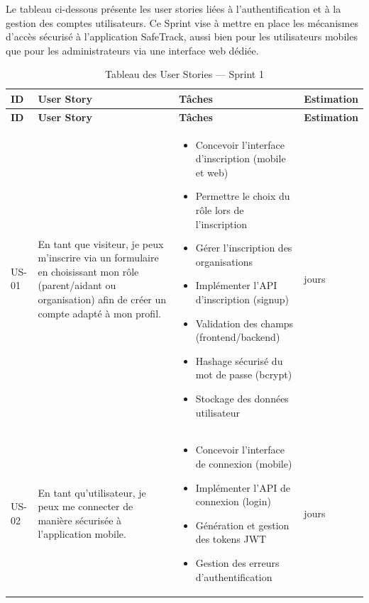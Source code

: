 Le tableau ci-dessous présente les user stories liées à l'authentification et à la gestion des comptes utilisateurs. Ce Sprint vise à mettre en place les mécanismes d'accès sécurisé à l'application SafeTrack, aussi bien pour les utilisateurs mobiles que pour les administrateurs via une interface web dédiée.

\small
\setlength{\tabcolsep}{3pt}
\renewcommand{\arraystretch}{1.0}
\setlength{\parskip}{0pt}
\begin{longtable}{|>{\centering\arraybackslash}p{}|>{\raggedright\arraybackslash}p{}|>{\raggedright\arraybackslash}p{}|>{\centering\arraybackslash}p{}|}
\caption{Tableau des User Stories — Sprint 1} \\
\hline
\textbf{ID} & \textbf{User Story} & \textbf{Tâches} & \textbf{Estimation} \\ \hline
\endfirsthead

\hline
\textbf{ID} & \textbf{User Story} & \textbf{Tâches} & \textbf{Estimation} \\ \hline
\endhead

\hline
\endlastfoot

US-01 & En tant que visiteur, je peux m'inscrire via un formulaire en choisissant mon rôle (parent/aidant ou organisation) afin de créer un compte adapté à mon profil.
& \begin{itemize}[leftmargin=*, nosep]
\item Concevoir l'interface d'inscription (mobile et web)
\item Permettre le choix du rôle lors de l'inscription
\item Gérer l'inscription des organisations
\item Implémenter l'API d'inscription (signup)
\item Validation des champs (frontend/backend)
\item Hashage sécurisé du mot de passe (bcrypt)
\item Stockage des données utilisateur
\end{itemize}
& 3 jours \\ \hline

US-02 & En tant qu'utilisateur, je peux me connecter de manière sécurisée à l'application mobile.
& \begin{itemize}[leftmargin=*, nosep]
\item Concevoir l'interface de connexion (mobile)
\item Implémenter l'API de connexion (login)
\item Génération et gestion des tokens JWT
\item Gestion des erreurs d'authentification
\end{itemize}
& 3 jours \\ \hline


\end{longtable}
